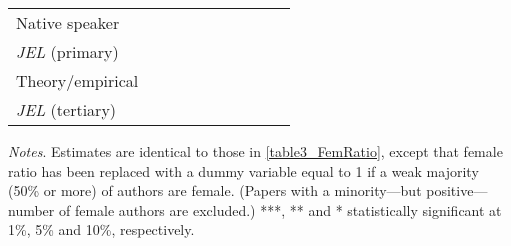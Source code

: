 \begin{table}[H]
\begin{threeparttable}
\begin{tabular}{p{2cm}S@{}S@{}S@{}S@{}S@{}S@{}S@{}S@{}S@{}}
            Native speaker                &               &               &               &               &           {}   &           {}   &           {}   &           {}   &           {}   \\
            \textit{JEL} (primary)        &               &               &               &               &               &               &           {}   &               &               \\
            Theory/empirical              &               &               &               &               &               &               &               &           {}   &               \\
            \textit{JEL} (tertiary)       &               &               &               &               &               &               &               &               &           {}   \\
            \bottomrule
        \end{tabular}
        \begin{tablenotes}
            \tiny
            \item \textit{Notes}. Estimates are identical to those in \autoref{table3_FemRatio}, except that female ratio has been replaced with a dummy variable equal to 1 if a weak majority (50\% or more) of authors are female. (Papers with a minority---but positive---number of female authors are excluded.) ***, ** and * statistically significant at 1\%, 5\% and 10\%, respectively.
        \end{tablenotes}
    \end{threeparttable}
\end{table}